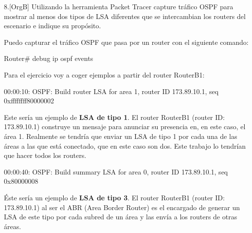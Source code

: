 \newpage
\begin{ejer}
8.[OrgB] Utilizando la herramienta Packet Tracer capture tráfico OSPF para mostrar al menos dos tipos de LSA diferentes que se intercambian los routers del escenario e indique su propósito.
\end{ejer}
\par Puedo capturar el tráfico OSPF que pasa por un router con el siguiente comando:
\begin{listing}[style=consola]
Router# debug ip ospf events
\end{listing}
\par Para el ejercicio voy a coger ejemplos a partir del router RouterB1:

\begin{listing}[style=consola]
00:00:10: OSPF: Build router LSA for area 1, router ID 173.89.10.1, seq 0xffffffff80000002
\end{listing}

\par Este sería un ejemplo de \textbf{LSA de tipo 1}. El router RouterB1 (router ID: 173.89.10.1) construye un mensaje para anunciar su presencia en, en este caso, el área 1. Realmente se tendría que enviar un LSA de tipo 1 por cada una de las áreas a las que está conectado, que en este caso son dos. Este trabajo lo tendrían que hacer todos los routers.

\begin{listing}[style=consola]
00:00:40: OSPF: Build summary LSA for area 0, router ID 173.89.10.1, seq 0x80000008
\end{listing}

\par Éste sería un ejemplo de \textbf{LSA de tipo 3}. El router RouterB1 (router ID: 173.89.10.1) al ser el ABR (Area Border Router) es el encargado de generar un LSA de este tipo por cada subred de un área y las envía a los routers de otras áreas.